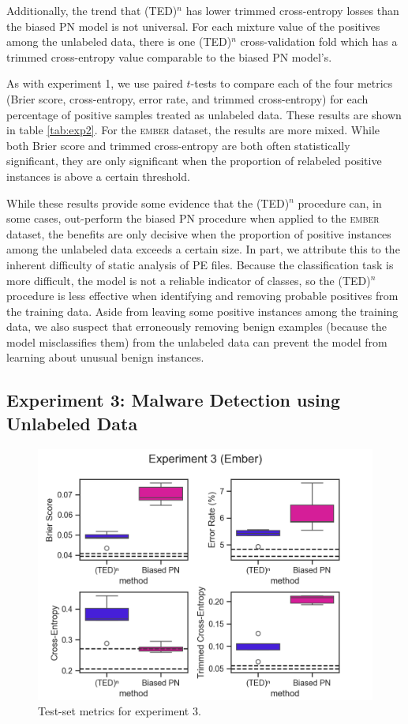 \documentclass[conference]{IEEEtran}
\begin{document}
    Additionally, the trend that (TED)${}^n$ has lower trimmed cross-entropy losses than the biased PN model is not universal. For each mixture value of the positives among the unlabeled data, there is one (TED)${}^n$ cross-validation fold which has a trimmed cross-entropy value comparable to the biased PN model's.

    As with experiment 1, we use paired $t$-tests to compare each of the four metrics (Brier score, cross-entropy, error rate, and trimmed cross-entropy) for each percentage of positive samples treated as unlabeled data. These results are shown in table \ref{tab:exp2}. For the \textsc{ember} dataset, the results are more mixed. While both Brier score and trimmed cross-entropy are both often statistically significant, they are only significant when the proportion of relabeled positive instances is above a certain threshold.

    While these results provide some evidence that the (TED)${}^n$ procedure can, in some cases, out-perform the biased PN procedure when applied to the \textsc{ember} dataset, the benefits are only decisive when the proportion of positive instances among the unlabeled data exceeds a certain size. In part, we attribute this to the inherent difficulty of static analysis of PE files. Because the classification task is more difficult, the model is not a reliable indicator of classes, so the (TED)${}^n$ procedure is less effective when identifying and removing probable positives from the training data. Aside from leaving some positive instances among the training data, we also suspect that erroneously removing benign examples (because the model misclassifies them) from the unlabeled data can prevent the model from learning about unusual benign instances.

\subsection{Experiment 3: Malware Detection using Unlabeled Data}
    
    \begin{figure}
        \centering 
        \includegraphics[scale=0.5]{experiment-3}
        \caption{Test-set metrics for experiment 3.} 
        \label{fig:exp3} 
    \end{figure} 
\end{document}

